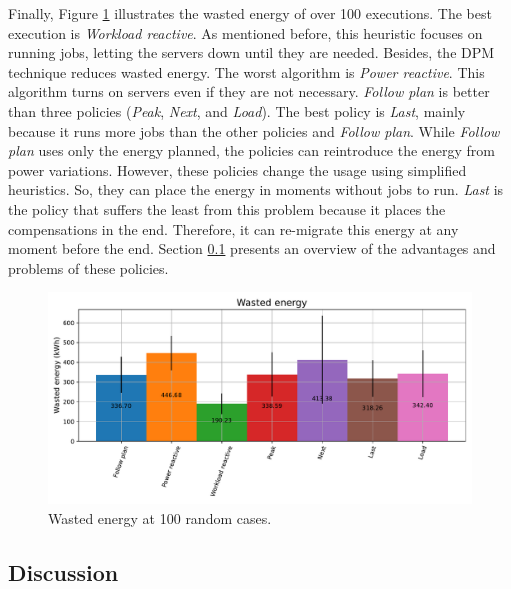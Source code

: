 Finally, Figure \ref{fig:energy_diff} illustrates the wasted energy of over 100 executions. The best execution is \emph{Workload reactive}. As mentioned before, this heuristic focuses on running jobs, letting the servers down until they are needed. Besides, the DPM technique reduces wasted energy. The worst algorithm is \emph{Power reactive}. This algorithm turns on servers even if they are not necessary. \emph{Follow plan} is better than three policies (\emph{Peak}, \emph{Next}, and \emph{Load}). The best policy is \emph{Last}, mainly because it runs more jobs than the other policies and \emph{Follow plan}. While \emph{Follow plan} uses only the energy planned, the policies can reintroduce the energy from power variations. However, these policies change the usage using simplified heuristics. So, they can place the energy in moments without jobs to run. \emph{Last} is the policy that suffers the least from this problem because it places the compensations in the end. Therefore, it can re-migrate this energy at any moment before the end. Section \ref{sec:compensation_discussion} presents an overview of the advantages and problems of these policies. 

\begin{figure}[!htb]
    \centering
    \includegraphics[scale=0.55]{Images/Compensations/energy_diff.pdf}
    \caption{Wasted energy at 100 random cases.}
    \label{fig:energy_diff}
\end{figure}


\subsection{Discussion}
\label{sec:compensation_discussion}

